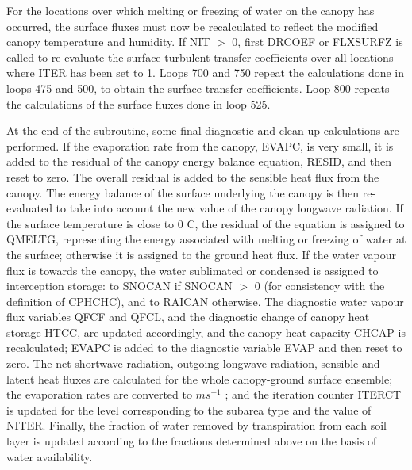 For the locations over which melting or freezing of water on the canopy has occurred, the surface fluxes must now be recalculated to reflect the modified canopy temperature and humidity. If N\+I\+T $>$ 0, first D\+R\+C\+O\+E\+F or F\+L\+X\+S\+U\+R\+F\+Z is called to re-\/evaluate the surface turbulent transfer coefficients over all locations where I\+T\+E\+R has been set to 1. Loops 700 and 750 repeat the calculations done in loops 475 and 500, to obtain the surface transfer coefficients. Loop 800 repeats the calculations of the surface fluxes done in loop 525.

At the end of the subroutine, some final diagnostic and clean-\/up calculations are performed. If the evaporation rate from the canopy, E\+V\+A\+P\+C, is very small, it is added to the residual of the canopy energy balance equation, R\+E\+S\+I\+D, and then reset to zero. The overall residual is added to the sensible heat flux from the canopy. The energy balance of the surface underlying the canopy is then re-\/evaluated to take into account the new value of the canopy longwave radiation. If the surface temperature is close to 0 C, the residual of the equation is assigned to Q\+M\+E\+L\+T\+G, representing the energy associated with melting or freezing of water at the surface; otherwise it is assigned to the ground heat flux. If the water vapour flux is towards the canopy, the water sublimated or condensed is assigned to interception storage\+: to S\+N\+O\+C\+A\+N if S\+N\+O\+C\+A\+N $>$ 0 (for consistency with the definition of C\+P\+H\+C\+H\+C), and to R\+A\+I\+C\+A\+N otherwise. The diagnostic water vapour flux variables Q\+F\+C\+F and Q\+F\+C\+L, and the diagnostic change of canopy heat storage H\+T\+C\+C, are updated accordingly, and the canopy heat capacity C\+H\+C\+A\+P is recalculated; E\+V\+A\+P\+C is added to the diagnostic variable E\+V\+A\+P and then reset to zero. The net shortwave radiation, outgoing longwave radiation, sensible and latent heat fluxes are calculated for the whole canopy-\/ground surface ensemble; the evaporation rates are converted to $m s^{-1}$ ; and the iteration counter I\+T\+E\+R\+C\+T is updated for the level corresponding to the subarea type and the value of N\+I\+T\+E\+R. Finally, the fraction of water removed by transpiration from each soil layer is updated according to the fractions determined above on the basis of water availability.